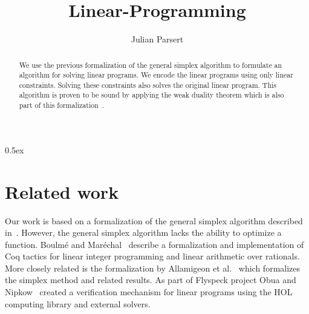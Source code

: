 \documentclass[11pt,a4paper]{article}
\begin{document}
\title{Linear-Programming}
\author{Julian Parsert}

\maketitle

\begin{abstract}
We use the previous formalization of the general simplex algorithm to
formulate an algorithm for solving linear programs.
We encode the linear programs using only linear constraints.
Solving these constraints also solves the original linear program.
This algorithm is proven to be sound by applying the weak duality theorem which is also part of this formalization~\cite{schrijver1998theory}.
\end{abstract}

\tableofcontents

\parindent 0pt\parskip 0.5ex

\section{Related work}
Our work is based on a formalization of the
general simplex algorithm described
in~\cite{SimplexAFP,Spasic:FormIncrSimplex}. However, the general
simplex algorithm lacks the ability to optimize a function. Boulmé and
Maréchal~\cite{Sylvain:CoqTacForEqualityLinArith} describe a
formalization and implementation of Coq tactics for linear integer
programming and linear arithmetic over rationals. More closely related
is the formalization by Allamigeon et
al.~\cite{Allamigeon:FormCvxPolyhedraSimplex} which formalizes the
simplex method and related results. As part of Flyspeck project Obua
and Nipkow~\cite{Obua2009} created a verification mechanism for linear
programs using the HOL computing library and external solvers.





\end{document}
